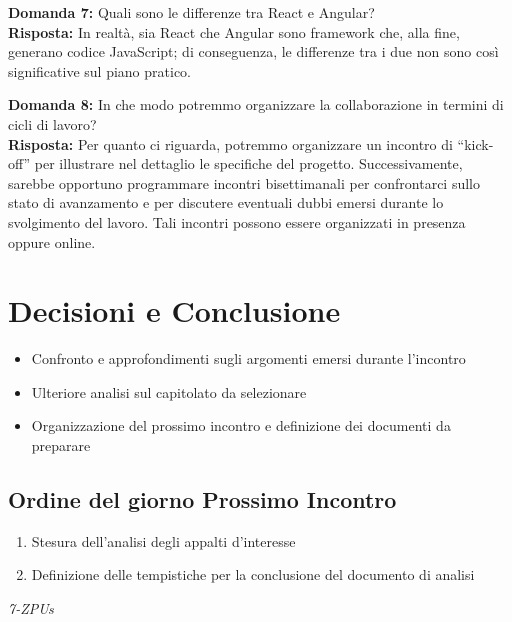 \documentclass[a4paper,12pt]{article}
\begin{document}
\vspace{2em}

\textbf{Domanda 7:} Quali sono le differenze tra React e Angular?\\[0.5em]
\textbf{Risposta:} In realtà, sia React che Angular sono framework che, alla fine, generano codice JavaScript; di conseguenza, le differenze tra i due non sono così significative sul piano pratico.

\vspace{2em}

\textbf{Domanda 8:} In che modo potremmo organizzare la collaborazione in termini di cicli di lavoro?\\[0.5em]
\textbf{Risposta:} Per quanto ci riguarda, potremmo organizzare un incontro di “kick-off” per illustrare nel dettaglio le specifiche del progetto. Successivamente, sarebbe opportuno programmare incontri bisettimanali per confrontarci sullo stato di avanzamento e per discutere eventuali dubbi emersi durante lo svolgimento del lavoro. Tali incontri possono essere organizzati in presenza oppure online.


\vspace{0.5cm}
\section{Decisioni e Conclusione}
\begin{itemize}
    \item Confronto e approfondimenti sugli argomenti emersi durante l'incontro
    \item Ulteriore analisi sul capitolato da selezionare
    \item Organizzazione del prossimo incontro e definizione dei documenti da preparare
\end{itemize}

\subsection{Ordine del giorno Prossimo Incontro}
\begin{enumerate}
    \item Stesura dell'analisi degli appalti d'interesse
    \item Definizione delle tempistiche per la conclusione del documento di analisi
\end{enumerate}

\vfill
\begin{flushright}
    \textit{7-ZPUs}
\end{flushright}
\end{document}
